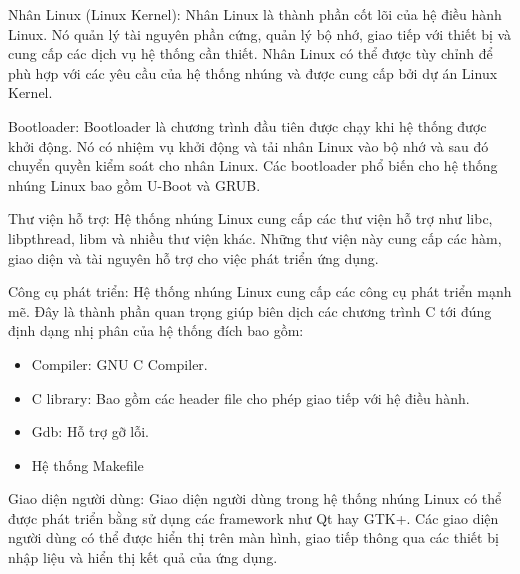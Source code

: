 Nhân Linux (Linux Kernel): Nhân Linux là thành phần cốt lõi của hệ điều hành Linux. Nó quản lý tài nguyên phần cứng, quản lý bộ nhớ, giao tiếp với thiết bị và cung cấp các dịch vụ hệ thống cần thiết. Nhân Linux có thể được tùy chỉnh để phù hợp với các yêu cầu của hệ thống nhúng và được cung cấp bởi dự án Linux Kernel.

Bootloader: Bootloader là chương trình đầu tiên được chạy khi hệ thống được khởi động. Nó có nhiệm vụ khởi động và tải nhân Linux vào bộ nhớ và sau đó chuyển quyền kiểm soát cho nhân Linux. Các bootloader phổ biến cho hệ thống nhúng Linux bao gồm U-Boot và GRUB.

Thư viện hỗ trợ: Hệ thống nhúng Linux cung cấp các thư viện hỗ trợ như libc, libpthread, libm và nhiều thư viện khác. Những thư viện này cung cấp các hàm, giao diện và tài nguyên hỗ trợ cho việc phát triển ứng dụng.

Công cụ phát triển: Hệ thống nhúng Linux cung cấp các công cụ phát triển mạnh mẽ. Đây là thành phần quan trọng giúp biên dịch các chương trình C tới đúng định dạng nhị phân của hệ thống đích bao gồm:
\begin{itemize}
	\item Compiler: GNU C Compiler.
	\item C library: Bao gồm các header file cho phép giao tiếp với hệ điều hành.
	\item Gdb: Hỗ trợ gỡ lỗi.
	\item Hệ thống Makefile
\end{itemize}

Giao diện người dùng: Giao diện người dùng trong hệ thống nhúng Linux có thể được phát triển bằng sử dụng các framework như Qt hay GTK+. Các giao diện người dùng có thể được hiển thị trên màn hình, giao tiếp thông qua các thiết bị nhập liệu và hiển thị kết quả của ứng dụng.

